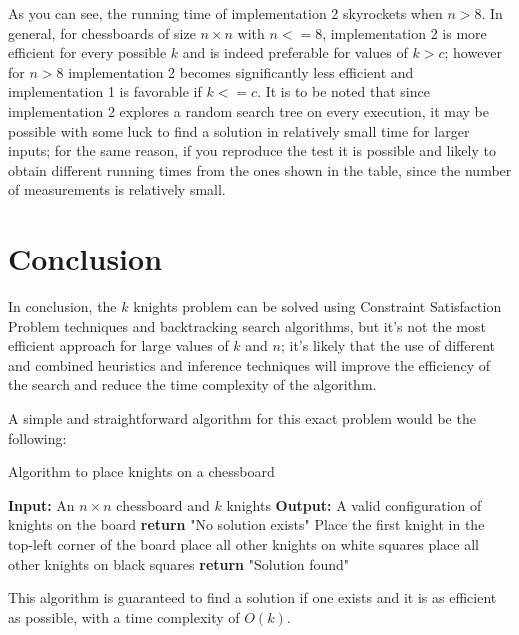 \documentclass[a4paper,12pt]{article}
\begin{document}
As you can see, the running time of implementation 2 skyrockets when \(n>8\). In general, for chessboards of size \(n \times n\) with \(n <= 8\), implementation 2 is  more efficient for every possible \(k\) and is indeed preferable for values of \(k>c\); however for \(n>8\) implementation 2 becomes significantly less efficient and implementation 1 is favorable if \(k<=c\). It is to be noted that since implementation 2 explores a random search tree on every execution, it may be possible with some luck to find a solution in relatively small time for larger inputs; for the same reason, if you reproduce the test it is possible and likely to obtain different running times from the ones shown in the table, since the number of measurements is relatively small.


\section{Conclusion}
In conclusion, the \(k\) knights problem can be solved using Constraint Satisfaction Problem techniques and backtracking search algorithms, 
but it's not the most efficient approach for large values of \( k \) and \( n \); it's likely that the use of different and combined heuristics
and inference techniques will improve the efficiency of the search and reduce the time complexity of the algorithm. 

A simple and straightforward algorithm for this exact problem would be the following:

\begin{algorithm}
    \caption{Algorithm to place knights on a chessboard}
    \label{algo:knight_placement}
    \begin{algorithmic}[1]
        \STATE \textbf{Input:} An \( n \times n \) chessboard and \( k \) knights
        \STATE \textbf{Output:} A valid configuration of knights on the board
            \STATE \textbf{return} "No solution exists"
        \ELSE
            \STATE Place the first knight in the top-left corner of the board
                \STATE place all other knights on white squares
            \ELSE 
                \STATE place all other knights on black squares
            \ENDIF
            \STATE \textbf{return} "Solution found"
        \ENDIF
    \end{algorithmic}
\end{algorithm}

This algorithm is guaranteed to find a solution if one exists and it is as efficient as possible, with a time complexity of \( O(k) \).

\end{document}

